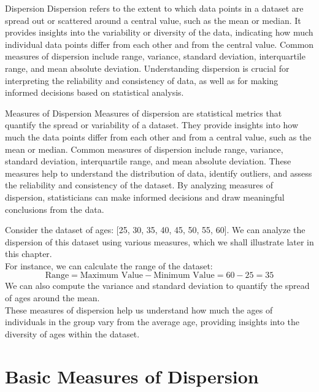 \documentclass[openany]{book}
\begin{document}
\begin{mydefinition}{Dispersion}
    Dispersion refers to the extent to which data points in a dataset are spread out or scattered around a central value, such as the mean or median. It provides insights into the variability or diversity of the data, indicating how much individual data points differ from each other and from the central value. Common measures of dispersion include range, variance, standard deviation, interquartile range, and mean absolute deviation. Understanding dispersion is crucial for interpreting the reliability and consistency of data, as well as for making informed decisions based on statistical analysis.
\end{mydefinition}
\begin{mydefinition}{Measures of Dispersion}
    Measures of dispersion are statistical metrics that quantify the spread or variability of a dataset. They provide insights into how much the data points differ from each other and from a central value, such as the mean or median. Common measures of dispersion include range, variance, standard deviation, interquartile range, and mean absolute deviation. These measures help to understand the distribution of data, identify outliers, and assess the reliability and consistency of the dataset. By analyzing measures of dispersion, statisticians can make informed decisions and draw meaningful conclusions from the data.
\end{mydefinition}
\begin{example}
    Consider the dataset of ages: [25, 30, 35, 40, 45, 50, 55, 60]. We can analyze the dispersion of this dataset using various measures, which we shall illustrate later in this chapter. \\
    For instance, we can calculate the range of the dataset:
    $$\text{Range} = \text{Maximum Value} - \text{Minimum Value} = 60 - 25 = 35$$
    We can also compute the variance and standard deviation to quantify the spread of ages around the mean. \\
    These measures of dispersion help us understand how much the ages of individuals in the group vary from the average age, providing insights into the diversity of ages within the dataset.
\end{example}

\section{Basic Measures of Dispersion}
\end{document}
